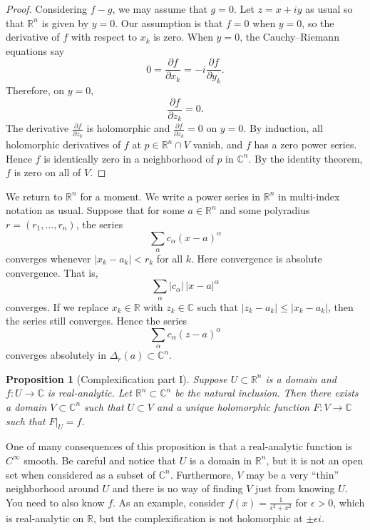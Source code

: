 \documentclass[12pt,openany]{book}
\newcommand{\sabs}[1]{\lvert {#1} \rvert}
\newcommand{\C}{{\mathbb{C}}}
\newcommand{\R}{{\mathbb{R}}}
\theoremstyle{plain}
\newtheorem{prop}[thm]{Proposition}
\theoremstyle{remark}
\theoremstyle{definition}
\theoremstyle{exercise}
\theoremstyle{example}
\begin{document}
\begin{proof}
Considering $f-g$, we may assume that $g=0$.
Let $z = x+iy$ as usual so that $\R^n$ is given by $y=0$.
Our assumption is that $f = 0$ when $y=0$,
so the derivative of $f$ with respect to $x_k$ is zero.
When $y=0$,
the Cauchy--Riemann equations say
\begin{equation*}
0 = \frac{\partial f}{\partial x_k} =
-i \frac{\partial f}{\partial y_k} .
\end{equation*}
Therefore, on $y=0$,
\begin{equation*}
\frac{\partial f }{\partial z_k} = 0 .
\end{equation*}
The derivative $\frac{\partial f }{\partial z_k}$ is holomorphic
and $\frac{\partial f }{\partial z_k} = 0$ on $y=0$.
By induction, all holomorphic derivatives of $f$ at $p \in \R^n \cap V$ vanish,
and $f$ has a zero
power series.  Hence $f$ is identically zero in a neighborhood of
$p$ in $\C^n$.
By the identity theorem, $f$ is zero on all of $V$.
\end{proof}


We return to $\R^n$ for a moment.
We write a power series in $\R^n$ in multi-index notation as usual.
Suppose that for some
$a \in \R^n$
and some polyradius
$r=(r_1,\ldots,r_n)$,
the series
\begin{equation*}
\sum_{\alpha} c_{\alpha} {(x-a)}^\alpha
\end{equation*}
converges whenever $\sabs{x_k-a_k} < r_k$ for all $k$.
Here convergence is absolute convergence.  That is,
\begin{equation*}
\sum_{\alpha} \sabs{c_{\alpha}}\, \sabs{x-a}^\alpha
\end{equation*}
converges.
If we replace $x_k \in \R$ with $z_k \in \C$ such that
$\sabs{z_k-a_k} \leq \sabs{x_k-a_k}$, then the series still converges.
Hence the series
\begin{equation*}
\sum_{\alpha} c_{\alpha} {(z-a)}^\alpha
\end{equation*}
converges absolutely in $\Delta_r(a) \subset \C^n$.

\begin{prop}[Complexification part I]
Suppose $U \subset \R^n$ is a domain and
$f \colon U \to \C$ is real-analytic.
Let $\R^n \subset \C^n$ be the natural inclusion.
Then there exists a domain $V \subset \C^n$ such that $U \subset V$
and a unique holomorphic function $F \colon V \to \C$ such that $F|_U = f$.
\end{prop}

One of many consequences
of this proposition is that
a real-analytic function is $C^\infty$ smooth.  Be careful
and notice that $U$ is a domain in $\R^n$, but it is not an open set
when considered as a subset of $\C^n$.  Furthermore, $V$ may be a very
``thin'' neighborhood around $U$ and there is no way of finding $V$ just from
knowing $U$.  You need to also know $f$.
As an example, consider
$f(x) = \frac{1}{\epsilon^2+x^2}$ for $\epsilon > 0$, which is
real-analytic on $\R$, but the complexification is not holomorphic at $\pm
\epsilon i$.
\end{document}
